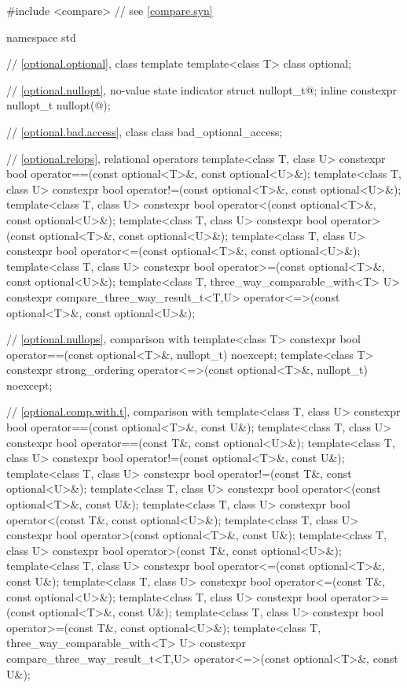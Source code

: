%
\begin{codeblock}
#include <compare>              // see \ref{compare.syn}

namespace std {
  // \ref{optional.optional}, class template 
  template<class T>
    class optional;

  // \ref{optional.nullopt}, no-value state indicator
  struct nullopt_t{@\seebelow@};
  inline constexpr nullopt_t nullopt(@\unspec@);

  // \ref{optional.bad.access}, class 
  class bad_optional_access;

  // \ref{optional.relops}, relational operators
  template<class T, class U>
    constexpr bool operator==(const optional<T>&, const optional<U>&);
  template<class T, class U>
    constexpr bool operator!=(const optional<T>&, const optional<U>&);
  template<class T, class U>
    constexpr bool operator<(const optional<T>&, const optional<U>&);
  template<class T, class U>
    constexpr bool operator>(const optional<T>&, const optional<U>&);
  template<class T, class U>
    constexpr bool operator<=(const optional<T>&, const optional<U>&);
  template<class T, class U>
    constexpr bool operator>=(const optional<T>&, const optional<U>&);
  template<class T, three_way_comparable_with<T> U>
    constexpr compare_three_way_result_t<T,U>
      operator<=>(const optional<T>&, const optional<U>&);

  // \ref{optional.nullops}, comparison with 
  template<class T> constexpr bool operator==(const optional<T>&, nullopt_t) noexcept;
  template<class T>
    constexpr strong_ordering operator<=>(const optional<T>&, nullopt_t) noexcept;

  // \ref{optional.comp.with.t}, comparison with 
  template<class T, class U> constexpr bool operator==(const optional<T>&, const U&);
  template<class T, class U> constexpr bool operator==(const T&, const optional<U>&);
  template<class T, class U> constexpr bool operator!=(const optional<T>&, const U&);
  template<class T, class U> constexpr bool operator!=(const T&, const optional<U>&);
  template<class T, class U> constexpr bool operator<(const optional<T>&, const U&);
  template<class T, class U> constexpr bool operator<(const T&, const optional<U>&);
  template<class T, class U> constexpr bool operator>(const optional<T>&, const U&);
  template<class T, class U> constexpr bool operator>(const T&, const optional<U>&);
  template<class T, class U> constexpr bool operator<=(const optional<T>&, const U&);
  template<class T, class U> constexpr bool operator<=(const T&, const optional<U>&);
  template<class T, class U> constexpr bool operator>=(const optional<T>&, const U&);
  template<class T, class U> constexpr bool operator>=(const T&, const optional<U>&);
  template<class T, three_way_comparable_with<T> U>
    constexpr compare_three_way_result_t<T,U>
      operator<=>(const optional<T>&, const U&);

}
\end{codeblock}
